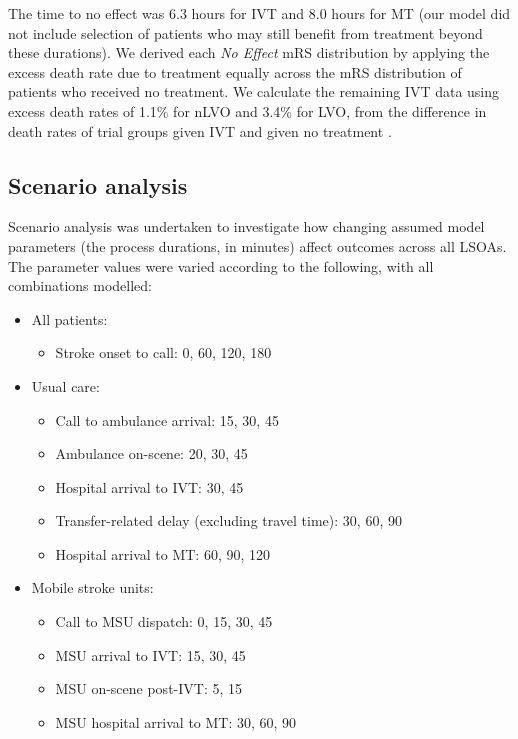 The time to no effect was 6.3 hours for IVT \cite{emberson_effect_2014} and 8.0 hours for MT \cite{ fransen_time_2016} (our model did not include selection of patients who may still benefit from treatment beyond these durations). We derived each \textit{No Effect} mRS distribution by applying the excess death rate due to treatment equally across the mRS distribution of patients who received no treatment. We calculate the remaining IVT data using excess death rates of 1.1\% for nLVO and 3.4\% for LVO, from the difference in death rates of trial groups given IVT and given no treatment \cite{emberson_effect_2014}. 

\subsection{Scenario analysis}

Scenario analysis was undertaken to investigate how changing assumed model parameters (the process durations, in minutes) affect outcomes across all LSOAs. The parameter values were varied according to the following, with all combinations modelled:

\begin{minipage}{1.0\textwidth}  %
\begin{spacing}{1.2}
\begin{itemize}
    \item All patients:
    \begin{itemize}
        \item Stroke onset to call: 0, 60, 120, 180
    \end{itemize}
    \item Usual care:
    \begin{itemize}
        \item Call to ambulance arrival: 15, 30, 45
        \item Ambulance on-scene: 20, 30, 45
        \item Hospital arrival to IVT: 30, 45
        \item Transfer-related delay (excluding travel time): 30, 60, 90
        \item Hospital arrival to MT: 60, 90, 120
    \end{itemize}
    \item Mobile stroke units:
    \begin{itemize}
        \item Call to MSU dispatch: 0, 15, 30, 45
        \item MSU arrival to IVT: 15, 30, 45
        \item MSU on-scene post-IVT: 5, 15
        \item MSU hospital arrival to MT: 30, 60, 90
    \end{itemize}
\end{itemize}
\end{spacing}
\end{minipage}


